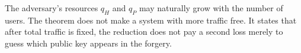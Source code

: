 \begin{remark}
The adversary's resources $q_H$ and $q_P$ may naturally grow with the number of
users.  The theorem does not make a system with more traffic free.  It states
that after total traffic is fixed, the reduction does not pay a second loss
merely to guess which public key appears in the forgery.
\end{remark}
